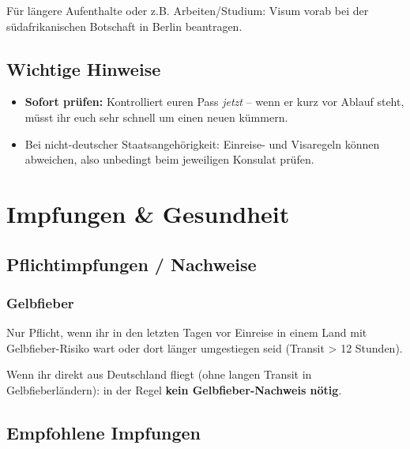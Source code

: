 \documentclass[12pt,a4paper]{article}
\begin{document}
\vspace{0.3cm}

Für längere Aufenthalte oder z.B. Arbeiten/Studium: Visum vorab bei der südafrikanischen Botschaft in Berlin beantragen.\cite{southafrica-diplo-1}

\subsection{Wichtige Hinweise}

\begin{itemize}[leftmargin=*]
    \item \textbf{Sofort prüfen:} Kontrolliert euren Pass \textit{jetzt} – wenn er kurz vor Ablauf steht, müsst ihr euch sehr schnell um einen neuen kümmern.
    \item Bei nicht-deutscher Staatsangehörigkeit: Einreise- und Visaregeln können abweichen, also unbedingt beim jeweiligen Konsulat prüfen.
\end{itemize}

\newpage
\section{Impfungen \& Gesundheit}

\subsection{Pflichtimpfungen / Nachweise}

\subsubsection{Gelbfieber}

Nur Pflicht, wenn ihr in den letzten Tagen vor Einreise in einem Land mit Gelbfieber-Risiko wart oder dort länger umgestiegen seid (Transit > 12 Stunden).\cite{adac-gesundheit-2}

\begin{successbox}
\faArrowRight \hspace{0.2cm} Wenn ihr direkt aus Deutschland fliegt (ohne langen Transit in Gelbfieberländern): in der Regel \textbf{kein Gelbfieber-Nachweis nötig}.
\end{successbox}

\subsection{Empfohlene Impfungen}
\end{document}
